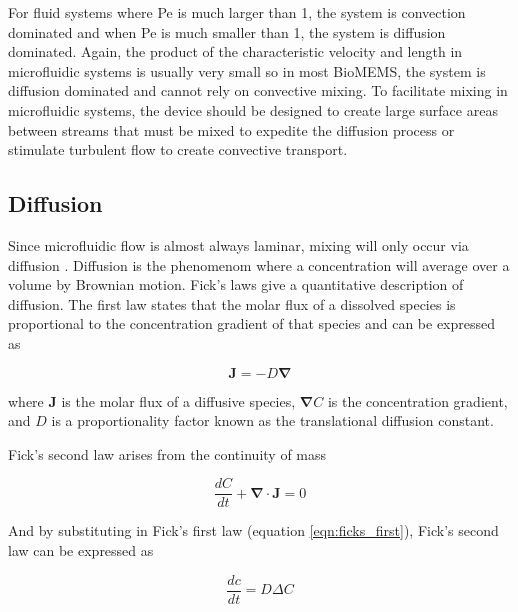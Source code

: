 \par For fluid systems where Pe is much larger than 1, the system is convection dominated and when Pe is much smaller than 1, the system is diffusion dominated. Again, the product of the characteristic velocity and length in microfluidic systems is usually very small so in most BioMEMS, the system is diffusion dominated and cannot rely on convective mixing. To facilitate mixing in microfluidic systems, the device should be designed to create large surface areas between streams that must be mixed to expedite the diffusion process or stimulate turbulent flow to create convective transport.


\subsection*{Diffusion}

\par Since microfluidic flow is almost always laminar, mixing will only occur via diffusion \cite{david_j._beebe_physics_2002}. Diffusion is the phenomenom where a concentration will average over a volume by Brownian motion. Fick's laws give a quantitative description of diffusion. The first law states that the molar flux of a dissolved species is proportional to the concentration gradient of that species and can be expressed as 

\begin{equation}
    \boldsymbol{J} = -D \boldsymbol{\nabla}
    \label{eqn:ficks_first}
\end{equation}

\noindent where $\boldsymbol{J}$ is the molar flux of a diffusive species, $\boldsymbol{\nabla}C$ is the concentration gradient, and $D$ is a proportionality factor known as the translational diffusion constant.

\par Fick's second law arises from the continuity of mass

\begin{equation}
    \frac{dC}{dt} + \boldsymbol{\nabla} \cdot \boldsymbol{J} = 0
\end{equation}

\noindent And by substituting in Fick's first law (equation \ref{eqn:ficks_first}), Fick's second law can be expressed as 

\begin{equation}
    \frac{dc}{dt} = D\Delta C
    \label{eqn:ficks_second}
\end{equation}

